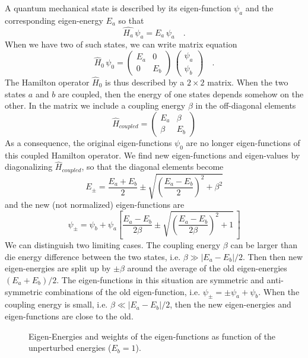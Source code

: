 A quantum mechanical state is described by its eigen-function $\psi_a$ and the corresponding eigen-energy $E_a$ so that 
\[
\hat{H_a}  \, \psi_a = E_a  \,\psi_a  \quad .
\]
When we have two of such states, we can  write matrix equation
\[
\hat{H}_0 \, \psi_0 = \begin{pmatrix}  E_a & 0 \\ 0 & E_b \end{pmatrix} \,
	 \begin{pmatrix}  \psi_ a\\ \psi_b\end{pmatrix}  \quad .
\]
The Hamilton operator $\hat{H}_0$ is thus described by a $2 \times 2$ matrix. When the two states $a$ and $b$ are coupled, then the energy of one states depends somehow on the other. In the matrix we include a coupling energy $\beta$ in the off-diagonal elements
\[
\hat{H}_{coupled}  = \begin{pmatrix}  E_a & \beta \\ \beta & E_b \end{pmatrix} 
\]
As a consequence, the original eigen-functions $\psi_0$ are no longer eigen-functions of this coupled Hamilton operator. We find new eigen-functions and eigen-values by diagonalizing $\hat{H}_{coupled}$, so that the diagonal elements become
\[
 E_\pm = \frac{E_a + E_b}{2} \pm \sqrt{ \left( \frac{E_a - E_b}{2} \right)^2 + \beta^2 }
\]
and the new (not normalized) eigen-functions are
\[
 \psi_{\pm} = \psi_b + \psi_a \left[ \frac{E_a - E_b}{2 \beta} \pm \sqrt{ \left( \frac{E_a - E_b}{2 \beta} \right)^2 + 1  } \, \right]
\]
We can distinguish two limiting cases. The coupling energy $\beta$ can be larger than die energy difference between the two states, i.e. $\beta \gg |E_a - E_b| / 2$. Then then new eigen-energies are split up by $\pm \beta$ around the average of the old eigen-energies $(E_a + E_b) /2$. The eigen-functions in this situation are symmetric and anti-symmetric combinations of the old eigen-function, i.e. $\psi_\pm = \pm \psi_a + \psi_b$. When the coupling energy is small, i.e. $\beta \ll |E_a - E_b| / 2$, then the new eigen-energies and eigen-functions are close to the old.



\begin{figure}
   
\caption{Eigen-Energies and weights of the eigen-functions as function of the unperturbed energies ($E_b = 1$).}
\end{figure}


